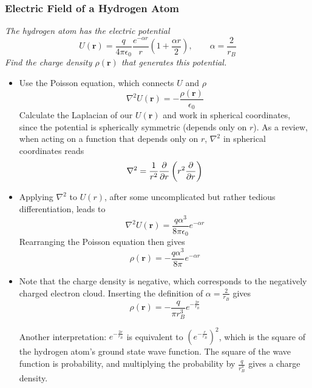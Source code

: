 \documentclass[11pt, a4paper]{article}
\renewcommand{\vec}[1]{\bm{#1}} %
\renewcommand{\r}{\vec{r}}
\begin{document}
\subsubsection{Electric Field of a Hydrogen Atom}
\textit{The hydrogen atom has the electric potential}
\begin{equation*}
	U(\r) = \frac{q}{4\pi \epsilon_{0}} \frac{e^{-\alpha r}}{r}\left(1 + \frac{\alpha r}{2}\right), \qquad \alpha = \frac{2}{r_{B}}
\end{equation*}
\textit{Find the charge density $ \rho(\r) $ that generates this potential.}
\begin{itemize}
	\item Use the Poisson equation, which connects $ U $ and $ \rho $
	\begin{equation*}
		\nabla^{2}U(\r) = - \frac{\rho(\r)}{\epsilon_{0}}
	\end{equation*}
	Calculate the Laplacian of our $ U(\r) $ and work in spherical coordinates, since the potential is spherically symmetric (depends only on $ r $). As a review, when acting on a function that depends only on $ r $, $ \nabla^{2} $ in spherical coordinates reads
	\begin{equation*}
		\nabla^{2} = \frac{1}{r^{2}} \pdv{}{r}\left(r^{2} \pdv{}{r}\right)
	\end{equation*}
	
	\item Applying $ \nabla^{2} $ to $ U(r) $, after some uncomplicated but rather tedious differentiation, leads to
	\begin{equation*}
		\nabla^{2}U(\r) = \frac{q\alpha^{3}}{8 \pi \epsilon_{0}}e^{-\alpha r}
	\end{equation*}
	Rearranging the Poisson equation then gives
	\begin{equation*}
		\rho(\r) = - \frac{q\alpha^{3}}{8 \pi}e^{-\alpha r}
	\end{equation*}
	
	\item Note that the charge density is negative, which corresponds to the negatively charged electron cloud. Inserting the definition of $ \alpha = \frac{2}{r_{B}}$ gives
	\begin{equation*}
		\rho(\r) = -\frac{q}{\pi r_{B}^{3}} e^{-\frac{2r}{r_{B}}}
	\end{equation*}
	
	Another interpretation: $ e^{-\frac{2r}{r_{B}}} $ is equivalent to $ \left(e^{-\frac{r}{r_{B}}}\right)^{2} $, which is the square of the hydrogen atom's ground state wave function. The square of the wave function is probability, and multiplying the probability by $ \frac{q}{r_{B}^{3}} $ gives a charge density. 
	

\end{itemize}
\end{document}
